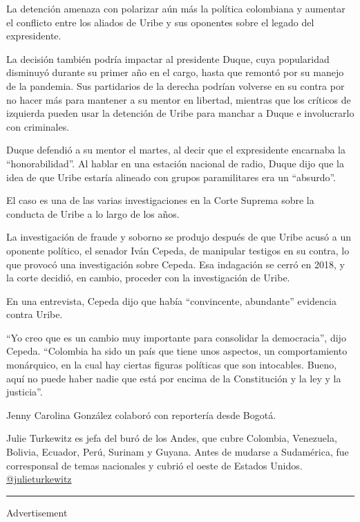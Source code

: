 La detención amenaza con polarizar aún más la política colombiana y
aumentar el conflicto entre los aliados de Uribe y sus oponentes sobre
el legado del expresidente.

La decisión también podría impactar al presidente Duque, cuya
popularidad disminuyó durante su primer año en el cargo, hasta que
remontó por su manejo de la pandemia. Sus partidarios de la derecha
podrían volverse en su contra por no hacer más para mantener a su mentor
en libertad, mientras que los críticos de izquierda pueden usar la
detención de Uribe para manchar a Duque e involucrarlo con criminales.

Duque defendió a su mentor el martes, al decir que el expresidente
encarnaba la ``honorabilidad''. Al hablar en una estación nacional de
radio, Duque dijo que la idea de que Uribe estaría alineado con grupos
paramilitares era un ``absurdo''.

El caso es una de las varias investigaciones en la Corte Suprema sobre
la conducta de Uribe a lo largo de los años.

La investigación de fraude y soborno se produjo después de que Uribe
acusó a un oponente político, el senador Iván Cepeda, de manipular
testigos en su contra, lo que provocó una investigación sobre Cepeda.
Esa indagación se cerró en 2018, y la corte decidió, en cambio, proceder
con la investigación de Uribe.

En una entrevista, Cepeda dijo que había ``convincente, abundante''
evidencia contra Uribe.

``Yo creo que es un cambio muy importante para consolidar la
democracia'', dijo Cepeda. ``Colombia ha sido un país que tiene unos
aspectos, un comportamiento monárquico, en la cual hay ciertas figuras
políticas que son intocables. Bueno, aquí no puede haber nadie que está
por encima de la Constitución y la ley y la justicia''.

Jenny Carolina González colaboró con reportería desde Bogotá.

Julie Turkewitz es jefa del buró de los Andes, que cubre Colombia,
Venezuela, Bolivia, Ecuador, Perú, Surinam y Guyana. Antes de mudarse a
Sudamérica, fue corresponsal de temas nacionales y cubrió el oeste de
Estados Unidos.
\href{https://twitter.com/julieturkewitz}{@julieturkewitz}

\begin{center}\rule{0.5\linewidth}{\linethickness}\end{center}

Advertisement

